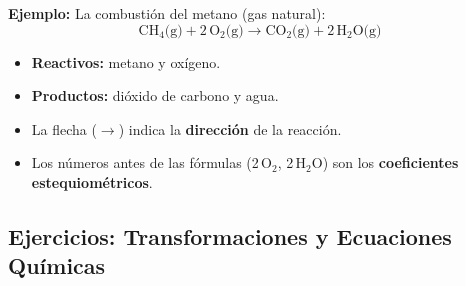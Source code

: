 \documentclass[12pt, letterpaper]{article}
\begin{document}
\noindent\textbf{Ejemplo:} La combustión del metano (gas natural):
$$\text{CH}_4\text{(g)} + 2\,\text{O}_2\text{(g)} \rightarrow \text{CO}_2\text{(g)} + 2\,\text{H}_2\text{O(g)}$$
\begin{itemize}
  \item \textbf{Reactivos:} metano y oxígeno.
  \item \textbf{Productos:} dióxido de carbono y agua.
  \item La flecha ($\rightarrow$) indica la \textbf{dirección} de la reacción.
  \item Los números antes de las fórmulas (2\,O$_2$, 2\,H$_2$O) son los \textbf{coeficientes estequiométricos}.
\end{itemize}
\subsection{Ejercicios: Transformaciones y Ecuaciones Químicas}
\end{document}
